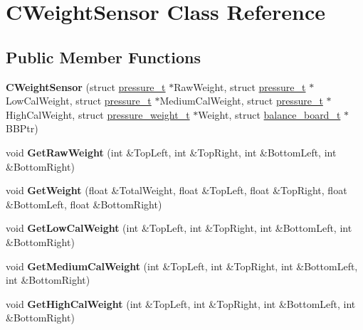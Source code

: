 \hypertarget{class_c_weight_sensor}{\section{\-C\-Weight\-Sensor \-Class \-Reference}
\label{class_c_weight_sensor}
}
\subsection*{\-Public \-Member \-Functions}
\begin{DoxyCompactItemize}
\item 
\hypertarget{class_c_weight_sensor_a04fea64b48194689bf78171e51e97b2d}{{\bfseries \-C\-Weight\-Sensor} (struct \hyperlink{structpressure__t}{pressure\-\_\-t} $\ast$\-Raw\-Weight, struct \hyperlink{structpressure__t}{pressure\-\_\-t} $\ast$\-Low\-Cal\-Weight, struct \hyperlink{structpressure__t}{pressure\-\_\-t} $\ast$\-Medium\-Cal\-Weight, struct \hyperlink{structpressure__t}{pressure\-\_\-t} $\ast$\-High\-Cal\-Weight, struct \hyperlink{structpressure__weight__t}{pressure\-\_\-weight\-\_\-t} $\ast$\-Weight, struct \hyperlink{structbalance__board__t}{balance\-\_\-board\-\_\-t} $\ast$\-B\-B\-Ptr)}\label{class_c_weight_sensor_a04fea64b48194689bf78171e51e97b2d}

\item 
\hypertarget{class_c_weight_sensor_a3afa84d9e73a9d4d86462661549b3114}{void {\bfseries \-Get\-Raw\-Weight} (int \&\-Top\-Left, int \&\-Top\-Right, int \&\-Bottom\-Left, int \&\-Bottom\-Right)}\label{class_c_weight_sensor_a3afa84d9e73a9d4d86462661549b3114}

\item 
\hypertarget{class_c_weight_sensor_a8c7a1bc975f98685aaad423a1e26cffd}{void {\bfseries \-Get\-Weight} (float \&\-Total\-Weight, float \&\-Top\-Left, float \&\-Top\-Right, float \&\-Bottom\-Left, float \&\-Bottom\-Right)}\label{class_c_weight_sensor_a8c7a1bc975f98685aaad423a1e26cffd}

\item 
\hypertarget{class_c_weight_sensor_a6cf2534f75d4f3dd629d49958f0ba7ee}{void {\bfseries \-Get\-Low\-Cal\-Weight} (int \&\-Top\-Left, int \&\-Top\-Right, int \&\-Bottom\-Left, int \&\-Bottom\-Right)}\label{class_c_weight_sensor_a6cf2534f75d4f3dd629d49958f0ba7ee}

\item 
\hypertarget{class_c_weight_sensor_a6d3ab9b23321846eb9bcf8401b02ba4e}{void {\bfseries \-Get\-Medium\-Cal\-Weight} (int \&\-Top\-Left, int \&\-Top\-Right, int \&\-Bottom\-Left, int \&\-Bottom\-Right)}\label{class_c_weight_sensor_a6d3ab9b23321846eb9bcf8401b02ba4e}

\item 
\hypertarget{class_c_weight_sensor_a554e7bb937f52a77bdc47f5048ef6c0a}{void {\bfseries \-Get\-High\-Cal\-Weight} (int \&\-Top\-Left, int \&\-Top\-Right, int \&\-Bottom\-Left, int \&\-Bottom\-Right)}\label{class_c_weight_sensor_a554e7bb937f52a77bdc47f5048ef6c0a}

\end{DoxyCompactItemize}
